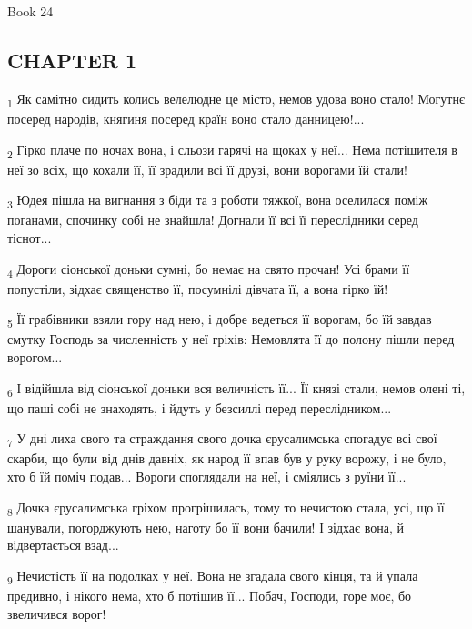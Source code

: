 Book 24
\subsection{CHAPTER 1}
\begin{tcolorbox}
\textsubscript{1} Як самітно сидить колись велелюдне це місто, немов удова воно стало! Могутнє посеред народів, княгиня посеред країн воно стало данницею!...
\end{tcolorbox}
\begin{tcolorbox}
\textsubscript{2} Гірко плаче по ночах вона, і сльози гарячі на щоках у неї... Нема потішителя в неї зо всіх, що кохали її, її зрадили всі її друзі, вони ворогами їй стали!
\end{tcolorbox}
\begin{tcolorbox}
\textsubscript{3} Юдея пішла на вигнання з біди та з роботи тяжкої, вона оселилася поміж поганами, спочинку собі не знайшла! Догнали її всі її переслідники серед тіснот...
\end{tcolorbox}
\begin{tcolorbox}
\textsubscript{4} Дороги сіонської доньки сумні, бо немає на свято прочан! Усі брами її попустіли, зідхає священство її, посумнілі дівчата її, а вона гірко їй!
\end{tcolorbox}
\begin{tcolorbox}
\textsubscript{5} Її грабівники взяли гору над нею, і добре ведеться її ворогам, бо їй завдав смутку Господь за численність у неї гріхів: Немовлята її до полону пішли перед ворогом...
\end{tcolorbox}
\begin{tcolorbox}
\textsubscript{6} І відійшла від сіонської доньки вся величність її... Її князі стали, немов олені ті, що паші собі не знаходять, і йдуть у безсиллі перед переслідником...
\end{tcolorbox}
\begin{tcolorbox}
\textsubscript{7} У дні лиха свого та страждання свого дочка єрусалимська спогадує всі свої скарби, що були від днів давніх, як народ її впав був у руку ворожу, і не було, хто б їй поміч подав... Вороги споглядали на неї, і сміялись з руїни її...
\end{tcolorbox}
\begin{tcolorbox}
\textsubscript{8} Дочка єрусалимська гріхом прогрішилась, тому то нечистою стала, усі, що її шанували, погорджують нею, наготу бо її вони бачили! І зідхає вона, й відвертається взад...
\end{tcolorbox}
\begin{tcolorbox}
\textsubscript{9} Нечистість її на подолках у неї. Вона не згадала свого кінця, та й упала предивно, і нікого нема, хто б потішив її... Побач, Господи, горе моє, бо звеличився ворог!
\end{tcolorbox}
